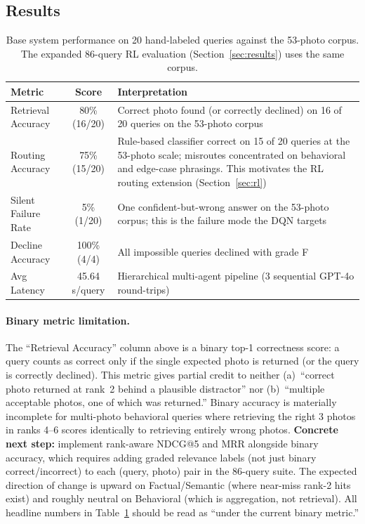 \documentclass[11pt,letterpaper]{article}
\begin{document}
\subsection{Results}

\begin{table}[H]
\centering
\begin{tabular}{lcp{7cm}}
\toprule
\textbf{Metric} & \textbf{Score} & \textbf{Interpretation} \\
\midrule
Retrieval Accuracy & 80\% (16/20) & Correct photo found (or correctly declined) on 16 of 20 queries on the 53-photo corpus \\
Routing Accuracy & 75\% (15/20) & Rule-based classifier correct on 15 of 20 queries at the 53-photo scale; misroutes concentrated on behavioral and edge-case phrasings. This motivates the RL routing extension (Section~\ref{sec:rl}) \\
Silent Failure Rate & 5\% (1/20) & One confident-but-wrong answer on the 53-photo corpus; this is the failure mode the DQN targets \\
Decline Accuracy & 100\% (4/4) & All impossible queries declined with grade F \\
Avg Latency & 45.64 s/query & Hierarchical multi-agent pipeline (3 sequential GPT-4o round-trips) \\
\bottomrule
\end{tabular}
\caption{Base system performance on 20 hand-labeled queries against the 53-photo corpus. The expanded 86-query RL evaluation (Section~\ref{sec:results}) uses the same corpus.}
\label{tab:base-results}
\end{table}

\paragraph{Binary metric limitation.} The ``Retrieval Accuracy'' column above is a binary top-1 correctness score: a query counts as correct only if the single expected photo is returned (or the query is correctly declined). This metric gives partial credit to neither (a)~``correct photo returned at rank~2 behind a plausible distractor'' nor (b)~``multiple acceptable photos, one of which was returned.'' Binary accuracy is materially incomplete for multi-photo behavioral queries where retrieving the right 3 photos in ranks 4--6 scores identically to retrieving entirely wrong photos. \textbf{Concrete next step:} implement rank-aware NDCG@5 and MRR alongside binary accuracy, which requires adding graded relevance labels (not just binary correct/incorrect) to each (query, photo) pair in the 86-query suite. The expected direction of change is upward on Factual/Semantic (where near-miss rank-2 hits exist) and roughly neutral on Behavioral (which is aggregation, not retrieval). All headline numbers in Table~\ref{tab:base-results} should be read as ``under the current binary metric.''
\end{document}

